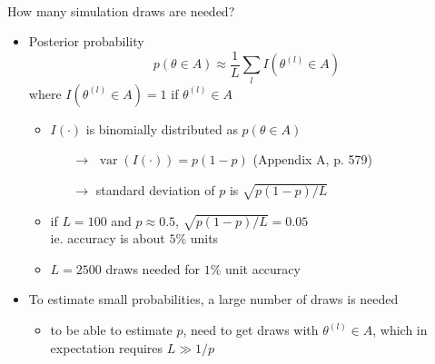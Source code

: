 \documentclass[finnish,english,t]{beamer}
\DeclareMathOperator{\var}{var}
\begin{document}
\begin{frame}
{\begin{minipage}[b][12cm][t]{12cm}
    \\
    \begin{center}
      \vspace{-\baselineskip}
\end{center}
  \end{minipage}
  }

\end{frame}

\begin{frame}
  
  {\Large\color{navyblue} How many simulation draws are needed?}

  \begin{itemize}
  \item Posterior probability
    \begin{equation*}
      p(\theta \in A)\approx \frac{1}{L}\sum_l I(\theta^{(l)} \in A)
    \end{equation*}
    where $I(\theta^{(l)} \in A)=1$ if $\theta^{(l)} \in A$
    \begin{itemize}
    \item $I(\cdot)$ is binomially distributed as $p(\theta \in A)$
        \begin{itemize}
        \item[$\rightarrow$] $\var(I(\cdot)) =  p(1-p)$  (Appendix A, p. 579)
        \item[$\rightarrow$] standard deviation of $p$ is $\sqrt{p(1-p)/L}$
        \end{itemize}
        \pause
      \item if $L=100$ and $p\approx 0.5$, $\sqrt{p(1-p)/L}=0.05$\\
        ie. accuracy is about $5\%$ units
        \pause
      \item $L=2500$ draws needed for $1\%$ unit accuracy
    \end{itemize}
    \pause
  \item To  estimate small probabilities, a large number of draws is needed
    \begin{itemize}
    \item to be able to estimate $p$, need to get draws with
      $\theta^{(l)} \in A$, which in expectation requires $L \gg 1/p$
    \end{itemize}
\end{itemize}

\end{frame}
\end{document}
